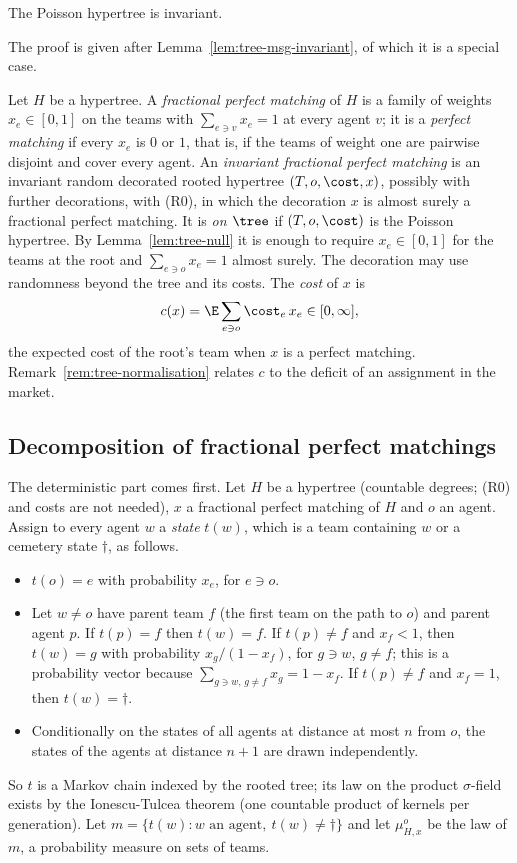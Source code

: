 \begin{lemma}\label{lem:tree-poisson-invariant}
The Poisson hypertree is invariant.
\end{lemma}

The proof is given after Lemma~\ref{lem:tree-msg-invariant}, of which it is a special case.

Let $H$ be a hypertree. A \emph{fractional perfect matching} of $H$ is a family of weights
$x_e\in[0,1]$ on the teams with $\sum_{e\ni v}x_e=1$ at every agent $v$; it is a \emph{perfect
matching} if every $x_e$ is $0$ or $1$, that is, if the teams of weight one are pairwise
disjoint and cover every agent. An \emph{invariant fractional perfect matching} is an invariant
random decorated rooted hypertree $(T,o,\cost,x)$, possibly with further decorations, with
(R0), in which the decoration $x$ is almost surely a fractional perfect matching. It is
\emph{on $\tree$} if $(T,o,\cost)$ is the Poisson hypertree. By Lemma~\ref{lem:tree-null} it is
enough to require $x_e\in[0,1]$ for the teams at the root and $\sum_{e\ni o}x_e=1$ almost
surely. The decoration may use randomness beyond the tree and its costs. The \emph{cost} of
$x$ is
\begin{equation}\label{eq:tree-cost}
  c(x)=\E\sum_{e\ni o}\cost_e\,x_e\in[0,\infty] ,
\end{equation}
the expected cost of the root's team when $x$ is a perfect matching.
Remark~\ref{rem:tree-normalisation} relates $c$ to the deficit of an assignment in the market.

\subsection{Decomposition of fractional perfect matchings}\label{subsec:tree-decomp}

The deterministic part comes first. Let $H$ be a hypertree (countable degrees; (R0) and costs
are not needed), $x$ a fractional perfect matching of $H$ and $o$ an agent. Assign to every
agent $w$ a \emph{state} $t(w)$, which is a team containing $w$ or a cemetery state
$\dagger$, as follows.
\begin{itemize}
\item $t(o)=e$ with probability $x_e$, for $e\ni o$.
\item Let $w\ne o$ have parent team $f$ (the first team on the path to $o$) and parent agent
$p$. If $t(p)=f$ then $t(w)=f$. If $t(p)\ne f$ and $x_f<1$, then $t(w)=g$ with probability
$x_g/(1-x_f)$, for $g\ni w$, $g\ne f$; this is a probability vector because
$\sum_{g\ni w,\,g\ne f}x_g=1-x_f$. If $t(p)\ne f$ and $x_f=1$, then $t(w)=\dagger$.
\item Conditionally on the states of all agents at distance at most $n$ from $o$, the states
of the agents at distance $n+1$ are drawn independently.
\end{itemize}
So $t$ is a Markov chain indexed by the rooted tree; its law on the product $\sigma$-field
exists by the Ionescu-Tulcea theorem (one countable product of kernels per generation). Let
$m=\{t(w):w\text{ an agent},\ t(w)\ne\dagger\}$ and let $\mu^o_{H,x}$ be the law of $m$, a
probability measure on sets of teams.

